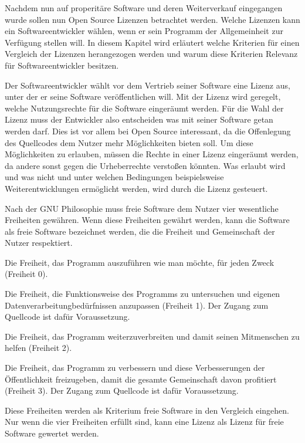Nachdem nun auf properitäre Software und deren Weiterverkauf eingegangen wurde sollen nun Open Source Lizenzen betrachtet werden. Welche Lizenzen kann ein Softwareentwickler w\"ahlen, wenn er sein Programm der Allgemeinheit zur Verf\"ugung stellen will. In diesem Kapitel wird erl\"autert welche Kriterien f\"ur einen Vergleich der Lizenzen herangezogen werden und warum diese Kriterien Relevanz f\"ur Softwareentwickler besitzen.

Der Softwareentwickler w\"ahlt vor dem Vertrieb seiner Software eine Lizenz aus, unter der er seine Software ver\"offentlichen will. Mit der Lizenz wird geregelt, welche Nutzungsrechte f\"ur die Software einger\"aumt werden. F\"ur die Wahl der Lizenz muss der Entwickler also entscheiden was mit seiner Software getan werden darf. Dies ist vor allem bei Open Source interessant, da die Offenlegung des Quellcodes dem Nutzer mehr M\"oglichkeiten bieten soll. Um diese M\"oglichkeiten zu erlauben, m\"ussen die Rechte in einer Lizenz einger\"aumt werden, da andere sonst gegen die Urheberrechte verstoßen k\"onnten. Was erlaubt wird und was nicht und unter welchen Bedingungen beispielsweise Weiterentwicklungen erm\"oglicht werden, wird durch die Lizenz gesteuert. 

Nach der GNU Philosophie muss freie Software dem Nutzer vier wesentliche Freiheiten gew\"ahren. Wenn diese Freiheiten gew\"ahrt werden, kann die Software als freie Software bezeichnet werden, \glqq{}die die Freiheit und Gemeinschaft der Nutzer respektiert.\grqq{} 

\begin{seList} 
\item Die Freiheit, das Programm auszuf\"uhren wie man m\"ochte, f\"ur jeden Zweck (Freiheit 0).
\item Die Freiheit, die Funktionsweise des Programms zu untersuchen und eigenen Datenverarbeitungbed\"urfnissen anzupassen (Freiheit 1). Der Zugang zum Quellcode ist daf\"ur Voraussetzung.
\item Die Freiheit, das Programm weiterzuverbreiten und damit seinen Mitmenschen zu helfen (Freiheit 2).
\item Die Freiheit, das Programm zu verbessern und diese Verbesserungen der \"Offentlichkeit freizugeben, damit die gesamte Gemeinschaft davon profitiert (Freiheit 3). Der Zugang zum Quellcode ist daf\"ur Voraussetzung.
\end{seList}
Diese Freiheiten werden als Kriterium \glqq{}freie Software\grqq{} in den Vergleich eingehen. Nur wenn die vier Freiheiten erf\"ullt sind, kann eine Lizenz als Lizenz f\"ur freie Software gewertet werden. 

